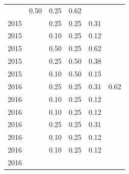 \begin{table}[H]
\begin{tabular}{| l | c | c | c | c | c |}
          &
          0.50
          &
          0.25
          &
          0.62
          &
          \\
            2015
          &
          
          &
          0.25
          &
          0.25
          &
          0.31
          &
          \\
            2015
          &
          
          &
          0.10
          &
          0.25
          &
          0.12
          &
          \\
            2015
          &
          
          &
          0.50
          &
          0.25
          &
          0.62
          &
          \\
            2015
          &
          
          &
          0.25
          &
          0.50
          &
          0.38
          &
          \\
            2015
          &
          
          &
          0.10
          &
          0.50
          &
          0.15
          &
          \\
\hline
            2016
          &
          
          &
          0.25
          &
          0.25
          &
          0.31
          &
            {\color{blue} 0.62}
          \\
            2016
          &
          
          &
          0.10
          &
          0.25
          &
          0.12
          &
          \\
            2016
          &
          
          &
          0.10
          &
          0.25
          &
          0.12
          &
          \\
            2016
          &
          
          &
          0.25
          &
          0.25
          &
          0.31
          &
          \\
            2016
          &
          
          &
          0.10
          &
          0.25
          &
          0.12
          &
          \\
            2016
          &
          
          &
          0.10
          &
          0.25
          &
          0.12
          &
          \\
            2016
          &
          

\end{tabular}
\end{table}
